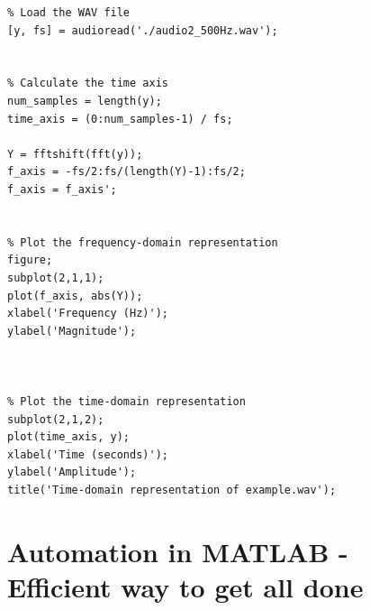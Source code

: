 \documentclass{report}
\begin{document}
\begin{lstlisting}
% Load the WAV file
[y, fs] = audioread('./audio2_500Hz.wav');


% Calculate the time axis
num_samples = length(y);
time_axis = (0:num_samples-1) / fs;

Y = fftshift(fft(y));
f_axis = -fs/2:fs/(length(Y)-1):fs/2;
f_axis = f_axis';


% Plot the frequency-domain representation
figure;
subplot(2,1,1);
plot(f_axis, abs(Y));
xlabel('Frequency (Hz)');
ylabel('Magnitude');



% Plot the time-domain representation
subplot(2,1,2);
plot(time_axis, y);
xlabel('Time (seconds)');
ylabel('Amplitude');
title('Time-domain representation of example.wav');
\end{lstlisting}



\section{Automation in MATLAB - Efficient way to get all done}
\end{document}
